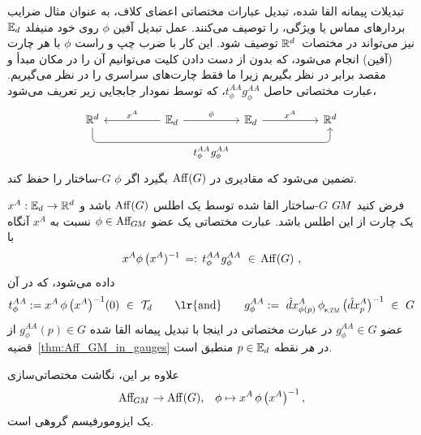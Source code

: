 تبدیلات پیمانه القا شده، تبدیل عبارات مختصاتی اعضای کلاف، به عنوان مثال ضرایب بردارهای مماس یا ویژگی، را توصیف می‌کنند.
عمل تبدیل آفین $\phi$ روی خود منیفلد $\mathbb{E}_d$ نیز می‌تواند در مختصات~$\mathbb{R}^d$ توصیف شود.
این کار با ضرب چپ و راست $\phi$ با هر چارت (آفین) انجام می‌شود، که بدون از دست دادن کلیت می‌توانیم آن را در مکان مبدأ و مقصد برابر در نظر بگیریم زیرا ما فقط چارت‌های سراسری را در نظر می‌گیریم.
عبارت مختصاتی حاصل $t_\phi^{AA} g_\phi^{AA}$، که توسط نمودار جابجایی زیر تعریف می‌شود،
\begin{equation}\label{cd:AffGM_in_chart}
	\begin{tikzcd}[row sep=2.5em, column sep=5em]
		\R^d
		\arrow[rrr, rounded corners, to path={
			|- node[below, pos=.75]{\small$t_\phi^{AA} \mkern1mu g_\phi^{AA}$} ([yshift=-3.ex, xshift=0ex]\tikztotarget.south)
			-- ([xshift=0ex]\tikztotarget.south)
		}]
		&
		\Euc_d
		\arrow[l, "{x^A}"']
		\arrow[r, "{\phi}"]
		&
		\Euc_d
		\arrow[r, "{x^A}"]
		&
		\R^d
	\end{tikzcd}
\end{equation}
تضمین می‌شود که مقادیری در $\operatorname{Aff}(G)$ بگیرد اگر $\phi$ $G$-ساختار را حفظ کند.
\begin{thm}
	\label{thm:Aff_GM_in_charts}
	فرض کنید $G\mkern-1.4muM$ $G$-ساختار القا شده توسط یک اطلس $\operatorname{Aff}(G)$ باشد و $x^A: \mathbb{E}_d \to \mathbb{R}^d$ یک چارت از این اطلس باشد.
	عبارت مختصاتی یک عضو $\phi \in \operatorname{Aff}_{\mkern-2muG\mkern-1.4muM}$ نسبت به $x^A$ آنگاه با
	\begin{align}\label{eq:AffGM_in_charts_eq}
		x^A \phi\, \big(x^A)^{-1} \,=:\, t_\phi^{AA} \mkern1mu g_\phi^{AA} \ \in\, \operatorname{Aff}(G) \ ,
	\end{align}
	داده می‌شود، که در آن
	\begin{align}
		t_\phi^{AA} := x^A \,\phi\, \big(x^A \big)^{-1} (0) \ \in\ \Trans_d
		\qquad \textup{\lr{and}} \qquad
		g_\phi^{AA} := 
		\hat{d}x^A_{\phi(p)} \,\dphiTM\, \big(\hat{d}x^A_p \big)^{-1} \ \in\ G
	\end{align}
	عضو $g_\phi^{AA} \in G$ در عبارت مختصاتی در اینجا با تبدیل پیمانه القا شده $g_\phi^{AA}(p) \in G$ از قضیه~\ref{thm:Aff_GM_in_gauges} در \emph{هر} نقطه $p \in \mathbb{E}_d$ منطبق است.
	
	علاوه بر این، نگاشت مختصاتی‌سازی
	\begin{align}
		\operatorname{Aff}_{\mkern-2muG\mkern-1.4muM} \to \operatorname{Aff}(G),\,\ \ \phi \mapsto x^A \,\phi\, \big(x^A \big)^{-1} \,,
	\end{align}
	یک ایزومورفیسم گروهی است.
\end{thm}

